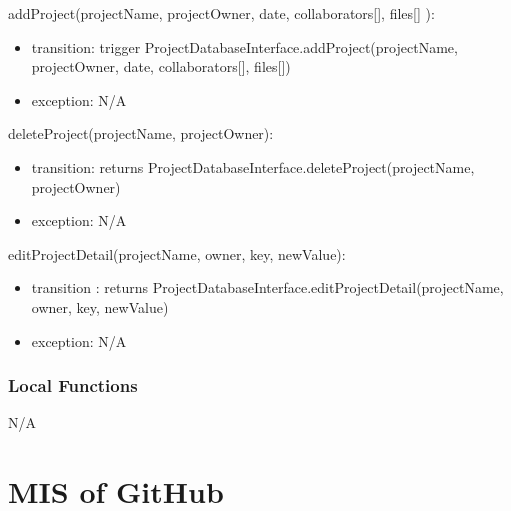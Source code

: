 \documentclass[12pt, titlepage]{article}
\begin{document}
	\noindent addProject(projectName, projectOwner, date, collaborators[], files[] ):
	\begin{itemize}
		\item transition: trigger ProjectDatabaseInterface.addProject(projectName, projectOwner, date, collaborators[], files[])
		
		\item exception: N/A
	\end{itemize}
	
	\noindent deleteProject(projectName, projectOwner):
	\begin{itemize}
		\item transition: returns ProjectDatabaseInterface.deleteProject(projectName, projectOwner)
		
		\item exception: N/A
	\end{itemize}
	
	\noindent editProjectDetail(projectName, owner, key, newValue):
	\begin{itemize}
		\item transition : returns ProjectDatabaseInterface.editProjectDetail(projectName, owner, key, newValue)
		
		\item exception: N/A
	\end{itemize}
	
	\subsubsection{Local Functions}
	
	N/A
	
	\newpage
	
	
	\section{MIS of GitHub} \label{Module} 
	
\end{document}
